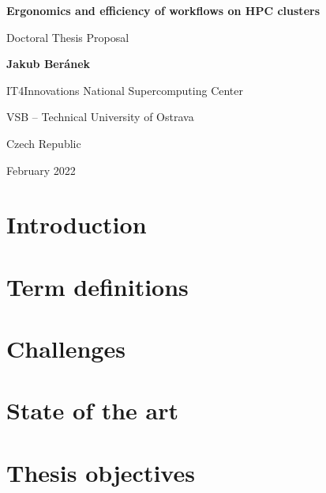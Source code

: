 \documentclass[11pt]{article}
\begin{document}
\begin{titlepage}
    \begin{center}
        \vspace*{1cm}
        \par
        \Huge
        \textbf{Ergonomics and efficiency of workflows on HPC clusters}
        \par
        \vspace{0.5cm}
        \LARGE
        Doctoral Thesis Proposal
        \par
        \vspace{1.5cm}
        \par
        \textbf{Jakub Beránek}
        \par
        \vspace{9.cm}
        \par
        {
            \Large
            IT4Innovations National Supercomputing Center\par
            VSB -- Technical University of Ostrava\par
            Czech Republic\par
            February 2022
        }
    \end{center}
\end{titlepage}

\tableofcontents
\clearpage

\section{Introduction}
\label{sec:introduction}


\section{Term definitions}
\label{sec:task_graph_definition}


\section{Challenges}
\label{sec:challenges}


\section{State of the art}
\label{sec:state_of_the_art}


\section{Thesis objectives}
\label{sec:objectives}

\end{document}
